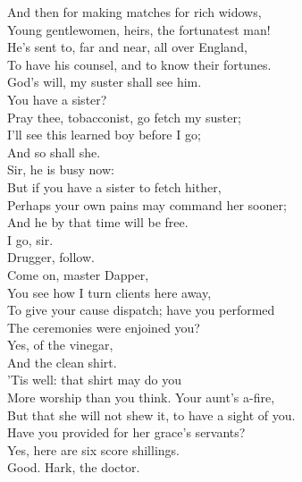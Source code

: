 \documentclass[a4paper,oneside,12pt]{memoir}
\begin{document}
\begin{drama*}
And then for making matches for rich widows,\\
Young gentlewomen, heirs, the fortunatest man!\\
He's sent to, far and near, all over England,\\
To have his counsel, and to know their fortunes.\\
\kastrilspeaks God's will, my suster shall see him.\\
\facespeaks {} You have a sister?\\
\kastrilspeaks Pray thee, tobacconist, go fetch my suster;\\
I'll see this learned boy before I go;\\
And so shall she.\\
\facespeaks {} Sir, he is busy now:\\
But if you have a sister to fetch hither,\\
Perhaps your own pains may command her sooner;\\
And he by that time will be free.\\
\kastrilspeaks {} I go, sir.\\
\facespeaks Drugger, follow.\\
 Come on, master Dapper,\\
You see how I turn clients here away,\\
To give your cause dispatch; have you performed\\
The ceremonies were enjoined you?\\
\dapperspeaks {} Yes, of the vinegar,\\
And the clean shirt.\\
\facespeaks {} 'Tis well: that shirt may do you\\
More worship than you think. Your aunt's a-fire,\\
But that she will not shew it, to have a sight of you.\\
Have you provided for her grace's servants?\\
\dapperspeaks Yes, here are six score shillings.\\
\facespeaks {} Good. Hark, the doctor.\\

\end{drama*}
\end{document}
